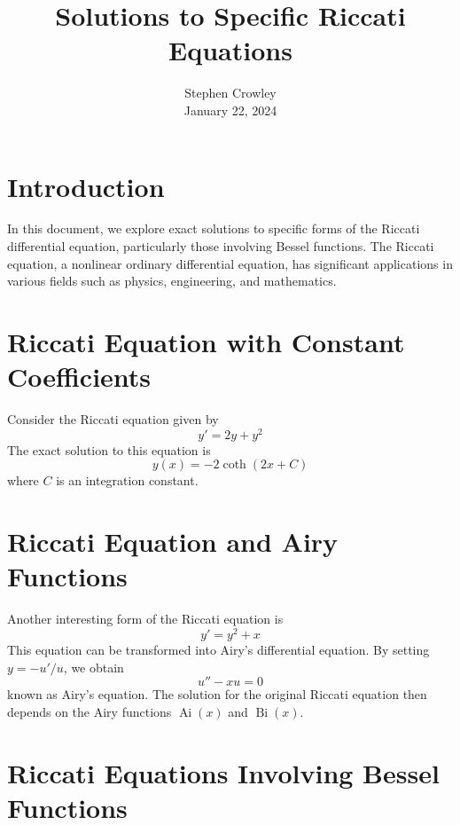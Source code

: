 \documentclass{article}
\newcommand{\tmaffiliation}[1]{\\ #1}
\newcommand{\tmop}[1]{\ensuremath{\operatorname{#1}}}
\begin{document}
\title{Solutions to Specific Riccati Equations}

\author{
  Stephen Crowley
  \tmaffiliation{January 22, 2024}
}

\maketitle

\section{Introduction}

In this document, we explore exact solutions to specific forms of the Riccati
differential equation, particularly those involving Bessel functions. The
Riccati equation, a nonlinear ordinary differential equation, has significant
applications in various fields such as physics, engineering, and mathematics.

\section{Riccati Equation with Constant Coefficients}

Consider the Riccati equation given by
\begin{equation}
  y' = 2 y + y^2
\end{equation}
The exact solution to this equation is
\begin{equation}
  y (x) = - 2 \coth (2 x + C)
\end{equation}
where $C$ is an integration constant.

\section{Riccati Equation and Airy Functions}

Another interesting form of the Riccati equation is
\begin{equation}
  y' = y^2 + x
\end{equation}
This equation can be transformed into Airy's differential equation. By setting
$y = - u' / u$, we obtain
\begin{equation}
  u'' - xu = 0
\end{equation}
known as Airy's equation. The solution for the original Riccati equation then
depends on the Airy functions $\tmop{Ai} (x)$ and $\tmop{Bi} (x)$.

\section{Riccati Equations Involving Bessel Functions}
\end{document}
